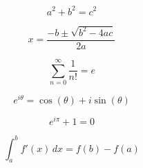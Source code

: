
\begin{equation}
 a^2 + b^2 = c^2
\end{equation}

\begin{equation}
 x = \frac{-b \pm \sqrt{b^2 - 4ac}}{2a}
\end{equation}

\begin{equation}
  \sum_{n=0}^{\infty} \frac{1}{n!} = e
\end{equation}

\begin{equation}
  e^{i\theta} = \cos(\theta) + i\sin(\theta)
\end{equation}

\begin{equation}
  e^{i\pi} + 1 = 0
\end{equation}

\begin{equation}
  \int_a^b f'(x) \, dx = f(b) - f(a)
\end{equation}
